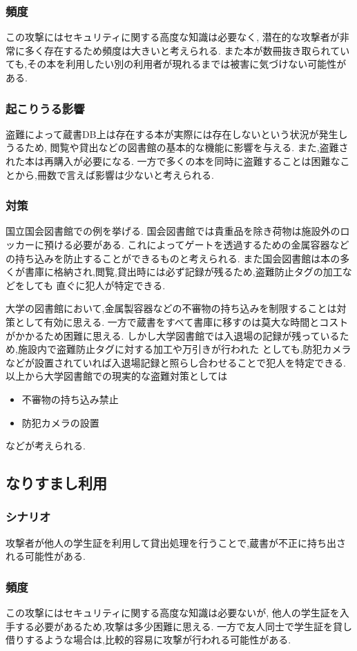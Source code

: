 \documentclass[uplatex,a4j,11pt,dvipdfmx]{jsarticle}
\begin{document}
\subsubsection{頻度}
この攻撃にはセキュリティに関する高度な知識は必要なく,
潜在的な攻撃者が非常に多く存在するため頻度は大きいと考えられる.
また本が数冊抜き取られていても,その本を利用したい別の利用者が現れるまでは被害に気づけない可能性がある.
\subsubsection{起こりうる影響}
盗難によって蔵書DB上は存在する本が実際には存在しないという状況が発生しうるため,
閲覧や貸出などの図書館の基本的な機能に影響を与える.
また,盗難された本は再購入が必要になる.
一方で多くの本を同時に盗難することは困難なことから,冊数で言えば影響は少ないと考えられる.
\subsubsection{対策}
国立国会図書館での例を挙げる.
国会図書館では貴重品を除き荷物は施設外のロッカーに預ける必要がある.
これによってゲートを透過するための金属容器などの持ち込みを防止することができるものと考えられる.
また国会図書館は本の多くが書庫に格納され,閲覧,貸出時には必ず記録が残るため,盗難防止タグの加工などをしても
直ぐに犯人が特定できる.

大学の図書館において,金属製容器などの不審物の持ち込みを制限することは対策として有効に思える.
一方で蔵書をすべて書庫に移すのは莫大な時間とコストがかかるため困難に思える.
しかし大学図書館では入退場の記録が残っているため,施設内で盗難防止タグに対する加工や万引きが行われた
としても,防犯カメラなどが設置されていれば入退場記録と照らし合わせることで犯人を特定できる.
以上から大学図書館での現実的な盗難対策としては
\begin{itemize}
  \item 不審物の持ち込み禁止
  \item 防犯カメラの設置
\end{itemize}
などが考えられる.
\subsection{なりすまし利用}
\subsubsection{シナリオ}
攻撃者が他人の学生証を利用して貸出処理を行うことで,蔵書が不正に持ち出される可能性がある.
\subsubsection{頻度}
この攻撃にはセキュリティに関する高度な知識は必要ないが,
他人の学生証を入手する必要があるため,攻撃は多少困難に思える.
一方で友人同士で学生証を貸し借りするような場合は,比較的容易に攻撃が行われる可能性がある.
\end{document}
